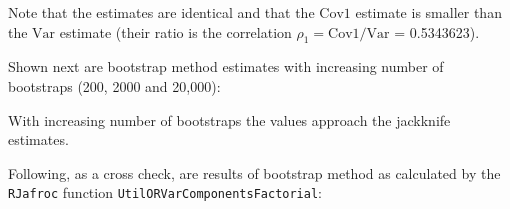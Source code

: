 \documentclass[
]{book}
\newenvironment{Shaded}{\begin{snugshade}}{\end{snugshade}}
\newcommand{\CommentTok}[1]{\textcolor[rgb]{0.56,0.35,0.01}{\textit{#1}}}
\newcommand{\DataTypeTok}[1]{\textcolor[rgb]{0.13,0.29,0.53}{#1}}
\newcommand{\DecValTok}[1]{\textcolor[rgb]{0.00,0.00,0.81}{#1}}
\newcommand{\KeywordTok}[1]{\textcolor[rgb]{0.13,0.29,0.53}{\textbf{#1}}}
\newcommand{\NormalTok}[1]{#1}
\newcommand{\OperatorTok}[1]{\textcolor[rgb]{0.81,0.36,0.00}{\textbf{#1}}}
\newcommand{\StringTok}[1]{\textcolor[rgb]{0.31,0.60,0.02}{#1}}
\begin{document}
Note that the estimates are identical and that the \(\text{Cov1}\) estimate is smaller than the \(\text{Var}\) estimate (their ratio is the correlation \(\rho_1 = \text{Cov1}/\text{Var}\) = 0.5343623).

Shown next are bootstrap method estimates with increasing number of bootstraps (200, 2000 and 20,000):

\begin{Shaded}
\end{Shaded}

With increasing number of bootstraps the values approach the jackknife estimates.

Following, as a cross check, are results of bootstrap method as calculated by the \texttt{RJafroc} function \texttt{UtilORVarComponentsFactorial}:
\end{document}
